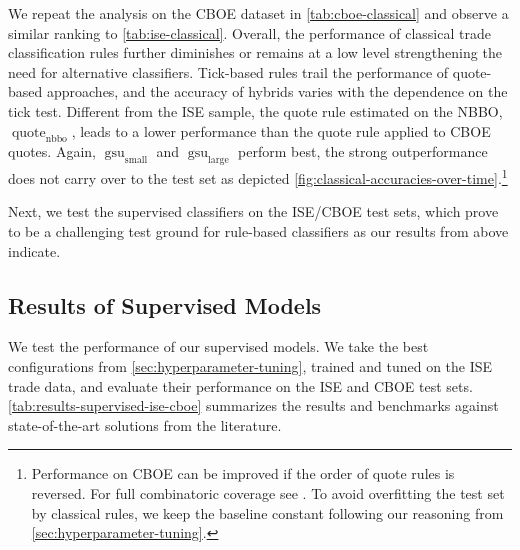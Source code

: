 We repeat the analysis on the \gls{CBOE} dataset in \cref{tab:cboe-classical} and observe a similar ranking to \cref{tab:ise-classical}. Overall, the performance of classical trade classification rules further diminishes or remains at a low level strengthening the need for alternative classifiers. Tick-based rules trail the performance of quote-based approaches, and the accuracy of hybrids varies with the dependence on the tick test. Different from the \gls{ISE} sample, the quote rule estimated on the \gls{NBBO}, $\operatorname{quote}_{\mathrm{nbbo}}$, leads to a lower performance than the quote rule applied to \gls{CBOE} quotes.
Again, $\operatorname{gsu}_{\mathrm{small}}$ and $\operatorname{gsu}_{\mathrm{large}}$ perform best, the strong outperformance does not carry over to the test set as depicted \cref{fig:classical-accuracies-over-time}.\footnote{Performance on \gls{CBOE} can be improved if the order of quote rules is reversed. For full combinatoric coverage see \textcite[][33]{grauerOptionTradeClassification2022}. To avoid overfitting the test set by classical rules, we keep the baseline constant following our reasoning from \cref{sec:hyperparameter-tuning}.}


Next, we test the supervised classifiers on the \gls{ISE}/\gls{CBOE} test sets, which prove to be a challenging test ground for rule-based classifiers as our results from above indicate.

\subsection{Results of Supervised
    Models}\label{sec:results-of-supervised-models}

We test the performance of our supervised models. We take the best configurations from \cref{sec:hyperparameter-tuning}, trained and tuned on the \gls{ISE} trade data, and evaluate their performance on the \gls{ISE} and \gls{CBOE} test sets. \cref{tab:results-supervised-ise-cboe} summarizes the results and benchmarks against state-of-the-art solutions from the literature.

